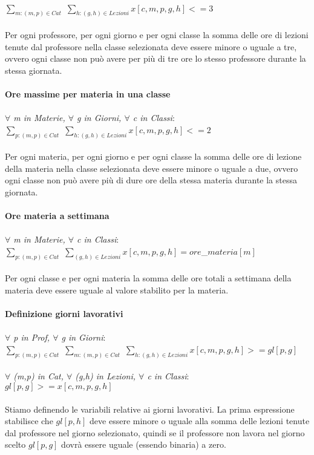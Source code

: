 \documentclass{article}
\begin{document}
	\\$\sum_{m : (m,p) \in Cat}$ $\sum_{h : (g,h) \in Lezioni}x[c,m,p,g,h] <= 3$
\\\\Per ogni professore, per ogni giorno e per ogni classe la somma delle ore di lezioni tenute dal professore nella classe selezionata deve essere minore o uguale a tre, ovvero ogni classe non può avere per più di tre ore lo stesso professore durante la stessa giornata.
\\\\\textbf{Ore massime per materia in una classe}
	\\\\\emph{$\forall$ m in Materie, $\forall$ g in Giorni, $\forall$ c in Classi}:
	\\$\sum_{p : (m,p) \in Cat}$ $\sum_{h : (g,h) \in Lezioni}x[c,m,p,g,h] <= 2$
\\\\Per ogni materia, per ogni giorno e per ogni classe la somma delle ore di lezione della materia nella classe selezionata deve essere minore o uguale a due, ovvero ogni classe non può avere più di dure ore della stessa materia durante la stessa giornata.
\\\\\textbf{Ore materia a settimana}
	\\\\\emph{$\forall$ m in Materie, $\forall$ c in Classi}:
	\\$\sum_{p : (m,p) \in Cat}$ $\sum_{(g,h) \in Lezioni}x[c,m,p,g,h] = ore$\_$materia[m]$
\\\\Per ogni classe e per ogni materia la somma delle ore totali a settimana della materia deve essere uguale al valore stabilito per la materia.
\\\\\textbf{Definizione giorni lavorativi}
	\\\\\emph{$\forall$ p in Prof, $\forall$ g in Giorni}:
	\\$\sum_{p : (m,p) \in Cat}$ $\sum_{m : (m,p) \in Cat}$ $\sum_{h : (g,h) \in Lezioni}x[c,m,p,g,h] >= gl[p,g]$
		\\\\\emph{$\forall$ (m,p) in Cat, $\forall$ (g,h) in Lezioni, $\forall$ c in Classi}:
	\\$gl[p,g] >= x[c,m,p,g,h]$
\\\\Stiamo definendo le variabili relative ai giorni lavorativi. La prima espressione stabilisce che $gl[p,h]$ deve essere minore o uguale alla somma delle lezioni tenute dal professore nel giorno selezionato, quindi se il professore non lavora nel giorno scelto $gl[p,g]$ dovrà essere uguale (essendo binaria) a zero.
\end{document}
